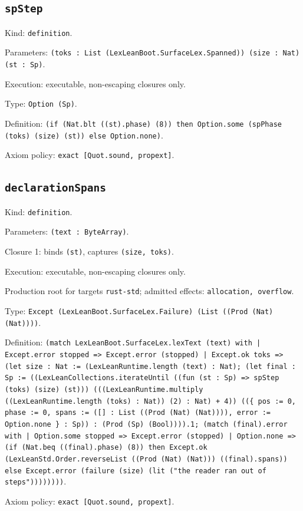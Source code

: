 \documentclass[11pt]{article}
\begin{document}
\subsection*{\texttt{spStep}}
\noindent Kind: \texttt{definition}.\par
\noindent Parameters: \texttt{(toks : List (LexLeanBoot.SurfaceLex.Spanned)) (size : Nat) (st : Sp)}.\par
\noindent Execution: executable, non-escaping closures only.\par
\noindent Type: \texttt{Option (Sp)}.\par
\noindent Definition: \texttt{(if (Nat.blt ((st).phase) (8)) then Option.some (spPhase (toks) (size) (st)) else Option.none)}.\par
\noindent Axiom policy: \texttt{exact [Quot.sound, propext]}.\par
\subsection*{\texttt{declarationSpans}}
\noindent Kind: \texttt{definition}.\par
\noindent Parameters: \texttt{(text : ByteArray)}.\par
\noindent Closure 1: binds \texttt{(st)}, captures \texttt{(size, toks)}.\par
\noindent Execution: executable, non-escaping closures only.\par
\noindent Production root for targets \texttt{rust-std}; admitted effects: \texttt{allocation, overflow}.\par
\noindent Type: \texttt{Except (LexLeanBoot.SurfaceLex.Failure) (List ((Prod (Nat) (Nat))))}.\par
\noindent Definition: \texttt{(match LexLeanBoot.SurfaceLex.lexText (text) with | Except.error stopped => Except.error (stopped) | Except.ok toks => (let size : Nat := (LexLeanRuntime.length (text) : Nat); (let final : Sp := ((LexLeanCollections.iterateUntil ((fun (st : Sp) => spStep (toks) (size) (st))) (((LexLeanRuntime.multiply ((LexLeanRuntime.length (toks) : Nat)) (2) : Nat) + 4)) ((\{ pos := 0, phase := 0, spans := ([] : List ((Prod (Nat) (Nat)))), error := Option.none \} : Sp)) : (Prod (Sp) (Bool)))).1; (match (final).error with | Option.some stopped => Except.error (stopped) | Option.none => (if (Nat.beq ((final).phase) (8)) then Except.ok (LexLeanStd.Order.reverseList ((Prod (Nat) (Nat))) ((final).spans)) else Except.error (failure (size) (lit ("the reader ran out of steps"))))))))}.\par
\noindent Axiom policy: \texttt{exact [Quot.sound, propext]}.\par
\end{document}
